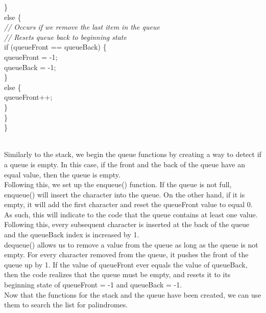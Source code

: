 \documentclass{article}
\begin{document}
{    \indent \}\\
    \indent else \{\\
        \textit{ \indent \indent // Occurs if we remove the last item in the queue\\
        \indent \indent // Resets queue back to beginning state\\ }
        \indent \indent if (queueFront == queueBack) \{\\
            \indent \indent \indent queueFront = -1;\\
            \indent \indent \indent queueBack = -1;\\
        \indent \indent \}\\
        \indent \indent else \{\\
            \indent \indent \indent queueFront++;\\
        \indent \indent \}\\
    \indent \}\\
\} \\~\\ }

Similarly to the stack, we begin the queue functions by creating a way to detect if a queue is empty. In this case, if the front and the back of the queue have an equal value, then the queue is empty. 
\\ Following this, we set up the enqueue() function. If the queue is not full, enqueue() will insert the character into the queue. On the other hand, if it is empty, it will add the first character and reset the queueFront value to equal 0. As such, this will indicate to the code that the queue contains at least one value. Following this, every subsequent character is inserted at the back of the queue and the queueBack index is increased by 1. 
\\ dequeue() allows us to remove a value from the queue as long as the queue is not empty. For every character removed from the queue, it pushes the front of the queue up by 1. If the value of queueFront ever equals the value of queueBack, then the code realizes that the queue must be empty, and resets it to its beginning state of queueFront = -1 and queueBack = -1.
\\ Now that the functions for the stack and the queue have been created, we can use them to search the list for palindromes.
\end{document}
